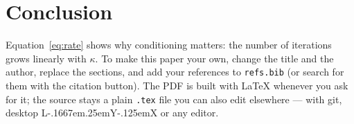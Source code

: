 \documentclass[11pt]{article}
\makeatletter
\providecommand{\LyX}{\texorpdfstring{%
  L\kern-.1667em\lower.25em\hbox{Y}\kern-.125emX\@}{LyX}}
\theoremstyle{plain}
\theoremstyle{plain}
\makeatother
\begin{document}
\section{Conclusion}

Equation~\eqref{eq:rate} shows why conditioning matters: the number of iterations grows linearly with $\kappa$. To make this paper your own, change the title and the author, replace the sections, and add your references to \texttt{refs.bib} (or search for them with the citation button). The PDF is built with \LaTeX{} whenever you ask for it; the source stays a plain \texttt{.tex} file you can also edit elsewhere --- with git, desktop \LyX{} or any editor.



\end{document}
